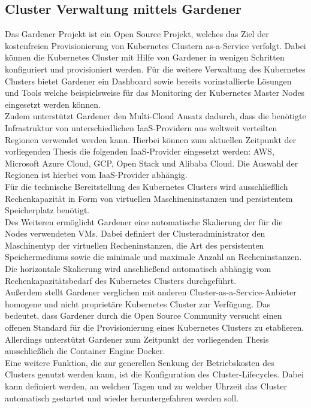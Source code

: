 \subsection{Cluster Verwaltung mittels Gardener}
\label{Cluster_Verwaltung}
Das Gardener Projekt ist ein Open Source Projekt, welches das Ziel der kostenfreien Provisionierung von Kubernetes Clustern as-a-Service verfolgt. Dabei können die Kubernetes Cluster mit Hilfe von Gardener in wenigen Schritten konfiguriert und provisioniert werden. Für die weitere Verwaltung des Kubernetes Clusters bietet Gardener ein Dashboard sowie bereits vorinstallierte Lösungen und Tools welche beispielsweise für das Monitoring der Kubernetes Master Nodes eingesetzt werden können.\autocite[Vgl.][Gardener Dashboard]{GardenerAuthors.20200120}
\\
Zudem unterstützt Gardener den Multi-Cloud Ansatz dadurch, dass die benötigte Infrastruktur von unterschiedlichen \ac{IaaS}-Providern aus weltweit verteilten Regionen verwendet werden kann. Hierbei können zum aktuellen Zeitpunkt der vorliegenden Thesis die folgenden \ac{IaaS}-Provider eingesetzt werden: \ac{AWS}, Microsoft Azure Cloud, \ac{GCP}, Open Stack und Alibaba Cloud.\autocite[Vgl.][K8s Conformance Test Coverage]{GardenerAuthors.20200121} Die Auswahl der Regionen ist hierbei vom \ac{IaaS}-Provider abhängig.\\
Für die technische Bereitstellung des Kubernetes Clusters wird ausschließlich Rechenkapazität in Form von virtuellen Maschineninstanzen und persistentem Speicherplatz benötigt.\\
Des Weiteren ermöglicht Gardener eine automatische Skalierung der für die Nodes verwendeten \acsp{VM}.
\newpage 
Dabei definiert der Clusteradministrator den Maschinentyp der virtuellen Recheninstanzen, die Art des persistenten Speichermediums sowie die minimale und maximale Anzahl an Recheninstanzen. Die horizontale Skalierung wird anschließend automatisch abhängig vom Rechenkapazitätsbedarf des Kubernetes Clusters durchgeführt. \\
Außerdem stellt Gardener verglichen mit anderen Cluster-as-a-Service-Anbieter homogene und nicht proprietäre Kubernetes Cluster zur Verfügung. Das bedeutet, dass Gardener durch die Open Source Community versucht einen offenen Standard für die Provisionierung eines Kubernetes Clusters zu etablieren. Allerdings unterstützt Gardener zum Zeitpunkt der vorliegenden Thesis ausschließlich die Container Engine Docker.\\
Eine weitere Funktion, die zur generellen Senkung der Betriebskosten des Clusters genutzt werden kann, ist die Konfiguration des Cluster-Lifecycles. Dabei kann definiert werden, an welchen Tagen und zu welcher Uhrzeit das Cluster automatisch gestartet und wieder heruntergefahren werden soll.\autocite[Vgl.][Configuration]{GardenerAuthors.20200120}
\\
